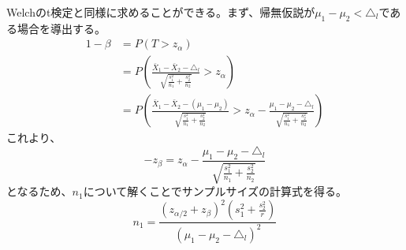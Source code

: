 Welchのt検定と同様に求めることができる。まず、帰無仮説が$\mu_{1} - \mu_{2} < \triangle_{l}$である場合を導出する。
\begin{align}
    1 - \beta & = P(T > z_{\alpha})                                                                                                                                                                                                                                \\
              & = P\left(\frac{\bar{X}_{1} - \bar{X}_{2} - \triangle_{l}}{\sqrt{\frac{s_{1}^{2}}{n_{1}} + \frac{s_{2}^{2}}{n_{2}}}} > z_{\alpha}\right)                                                                                                            \\
              & = P\left(\frac{\bar{X}_{1} - \bar{X}_{2} - (\mu_{1} - \mu_{2})}{\sqrt{\frac{s_{1}^{2}}{n_{1}} + \frac{s_{2}^{2}}{n_{2}}}} > z_{\alpha} - \frac{\mu_{1} - \mu_{2} - \triangle_{l}}{\sqrt{\frac{s_{1}^{2}}{n_{1}} + \frac{s_{2}^{2}}{n_{2}}}}\right)
\end{align}
これより、
\begin{equation}
    -z_{\beta} = z_{\alpha} - \frac{\mu_{1} - \mu_{2} - \triangle_{l}}{\sqrt{\frac{s_{1}^{2}}{n_{1}} + \frac{s_{2}^{2}}{n_{2}}}}
\end{equation}
となるため、$n_{1}$について解くことでサンプルサイズの計算式を得る。
\begin{equation}
    n_{1} = \frac{(z_{\alpha/2} + z_{\beta})^{2} \left(s_{1}^{2} + \frac{s_{2}^{2}}{r}\right)}{(\mu_{1} - \mu_{2} - \triangle_{l})^{2}}
\end{equation}

